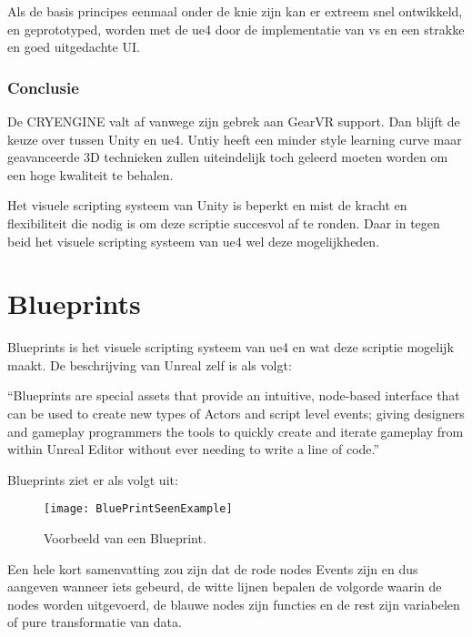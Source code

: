 Als de basis principes eenmaal onder de knie zijn kan er extreem snel ontwikkeld, en geprototyped, worden met de \gls{ue4} door de implementatie van \gls{vs} en een strakke en goed uitgedachte UI.

\subsubsection{Conclusie}
De CRYENGINE valt af vanwege zijn gebrek aan GearVR support. Dan blijft de keuze over tussen Unity en \gls{ue4}. Untiy heeft een minder style learning curve maar geavanceerde 3D technieken zullen uiteindelijk toch geleerd moeten worden om een hoge kwaliteit te behalen. 

Het visuele scripting systeem van Unity is beperkt en mist de kracht en flexibiliteit die nodig is om deze scriptie succesvol af te ronden. Daar in tegen beid het visuele scripting systeem van \gls{ue4} wel deze mogelijkheden.

\section{Blueprints}
Blueprints is het visuele scripting systeem van \gls{ue4} en wat deze scriptie mogelijk maakt. De beschrijving van Unreal zelf is als volgt:

“Blueprints are special assets that provide an intuitive, node-based interface that can be used to create new types of Actors and script level events; giving designers and gameplay programmers the tools to quickly create and iterate gameplay from within Unreal Editor without ever needing to write a line of code.”

Blueprints ziet er als volgt uit:

\begin{figure}[!ht]
  \centering
    \texttt{[image: BluePrintSeenExample]}
    \caption{Voorbeeld van een Blueprint.}
\end{figure}

Een hele kort samenvatting zou zijn dat de rode nodes Events zijn en dus aangeven wanneer iets gebeurd, de witte lijnen bepalen de volgorde waarin de nodes worden uitgevoerd, de blauwe nodes zijn functies en de rest zijn variabelen of pure transformatie van data.